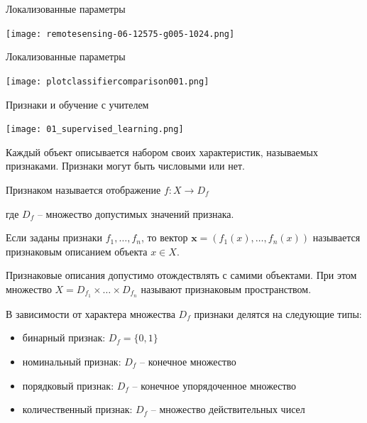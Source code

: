 \documentclass[pdf, intlimits, 9pt, unicode]{beamer}
\begin{document}
\begin{frame}{Локализованные параметры}\begin{center}\texttt{[image: remotesensing-06-12575-g005-1024.png]}\end{center}\end{frame}

\begin{frame}{Локализованные параметры}\begin{center}\texttt{[image: plotclassifiercomparison001.png]}\end{center}\end{frame}





\begin{frame}{Признаки и обучение с учителем}\begin{center}\texttt{[image: 01\_supervised\_learning.png]}\end{center}\end{frame}






\begin{frame}
Каждый объект описывается набором своих характеристик, называемых {\color{red}признаками}. Признаки могут быть числовыми или нет.\pause

Признаком называется отображение $f : X \to D_f$\pause

где $D_f$ -- множество допустимых значений признака.\pause

Если заданы признаки $f_1,\dots,f_n$, то вектор ${\mathbf x} = (f_1(x),\dots,f_n(x))$ называется признаковым описанием объекта $x \in X$.\pause

Признаковые описания допустимо отождествлять с самими объектами. При этом множество $X = D_{f_1}\times\dots\times D_{f_n}$ называют признаковым пространством.
\end{frame}






\begin{frame}
В зависимости от характера множества $D_f$ признаки делятся на следующие типы:
\bigskip

\begin{itemize}
\item {\color{red}бинарный} признак: $D_f=\{0,1\}$\pause
\item {\color{red}номинальный} признак: $D_f$ -- конечное множество\pause
\item {\color{red}порядковый} признак: $D_f$ -- конечное упорядоченное множество\pause
\item {\color{red}количественный} признак: $D_f$ -- множество действительных чисел
\end{itemize}

\end{frame}
\end{document}
